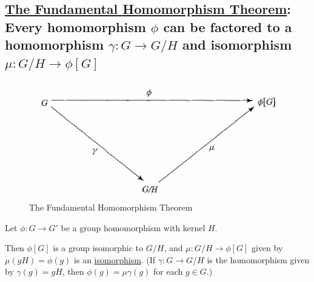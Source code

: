 \documentclass[11pt]{elegantbook}
\begin{document}
\subsection{\underline{The Fundamental Homomorphism Theorem}: Every homomorphism $\phi$ can be factored to a homomorphism $\gamma: G \rightarrow G/H$ and isomorphism $\mu : G/H \rightarrow	\phi[G]$}
\begin{center}\begin{figure}[htbp]
    \centering
    \includegraphics[scale=0.5]{FHT.png}
    \caption{The Fundamental Homomorphism Theorem}
    \label{}
\end{figure}\end{center}
\begin{theorem}
    \quad
    \begin{center}
    \end{center}

    Let $\phi: G \rightarrow G'$ be a group
    homomorphism with kernel $H$.
    
    Then $\phi[G]$ is a group isomorphic to $G/H$, and $\mu: G/H \rightarrow \phi[G]$ given by $\mu(gH)=\phi(g)$ is an \underline{isomorphism}.
    (If $\gamma:G \rightarrow G/H$ is the homomorphism given by $\gamma(g) = gH$, then $\phi(g) = \mu\gamma(g)$ for each $g\in G$.)
\end{theorem}
\end{document}
